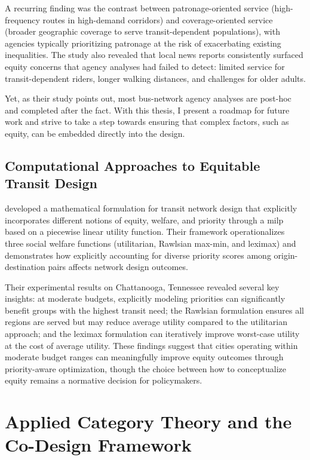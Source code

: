 A recurring finding was the contrast between patronage-oriented service (high-frequency routes in high-demand corridors) and coverage-oriented service (broader geographic coverage to serve transit-dependent populations), with agencies typically prioritizing patronage at the risk of exacerbating existing inequalities. The study also revealed that local news reports consistently surfaced equity concerns that agency analyses had failed to detect: limited service for transit-dependent riders, longer walking distances, and challenges for older adults.

Yet, as their study points out, most bus-network agency analyses are post-hoc and completed after the fact. With this thesis, I present a roadmap for future work and strive to take a step towards ensuring that complex factors, such as equity, can be embedded directly into the design.

\subsection{Computational Approaches to Equitable Transit Design}

\textcite{paviaDesigningEquitableTransit2023} developed a mathematical formulation for transit network design that explicitly incorporates different notions of equity, welfare, and priority through a \gls{milp} based on a piecewise linear utility function. Their framework operationalizes three social welfare functions (utilitarian, Rawlsian max-min, and leximax) and demonstrates how explicitly accounting for diverse priority scores among origin-destination pairs affects network design outcomes.

Their experimental results on Chattanooga, Tennessee revealed several key insights: at moderate budgets, explicitly modeling priorities can significantly benefit groups with the highest transit need; the Rawlsian formulation ensures all regions are served but may reduce average utility compared to the utilitarian approach; and the leximax formulation can iteratively improve worst-case utility at the cost of average utility. These findings suggest that cities operating within moderate budget ranges can meaningfully improve equity outcomes through priority-aware optimization, though the choice between how to conceptualize equity remains a normative decision for policymakers.

\section{Applied Category Theory and the Co-Design Framework}
